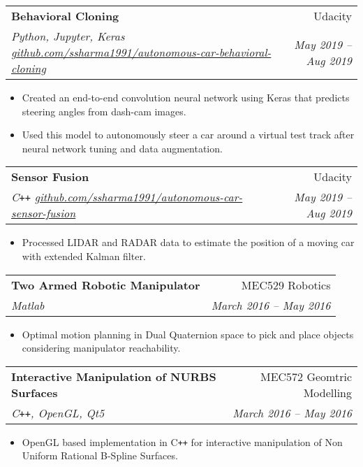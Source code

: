 \documentclass[letterpaper,10pt]{article}
\makeatletter
\newcommand{\resumeHeading}[4]{
  \vspace{-1pt}
    \begin{tabular*}{0.97\textwidth}{l@{\extracolsep{\fill}}r}
      \textbf{#1} & #2 \vspace{-2pt}\\ \vspace{1pt}
      \textit{\small#3} & \textit{\small #4} \\
    \end{tabular*}
}
\newcommand{\resumeItemListStart}{
\vspace{-7pt}
\begin{itemize}[leftmargin=14pt]
}
\newcommand{\resumeItemListEnd}{
\vspace{+7pt}
\end{itemize}
}
\newcommand{\resumeItem}[1]{
  \item\small{
      {#1 \vspace{-7pt}
      }
  }
}
\makeatother
\begin{document}
    \vspace{-2pt}
    \resumeHeading{Behavioral Cloning}{Udacity}{Python, Jupyter, Keras \href{https://github.com/ssharma1991/autonomous-car-behavioral-cloning}{github.com/ssharma1991/autonomous-car-behavioral-cloning}}{May 2019 -- Aug 2019}
    \resumeItemListStart
    \resumeItem{Created an end-to-end convolution neural network using Keras that predicts steering angles from dash-cam images.}
    \resumeItem{Used this model to autonomously steer a car  around a virtual test track after neural network tuning and data augmentation.}
    \resumeItemListEnd
    
    \vspace{-2pt}
    \resumeHeading{Sensor Fusion}{Udacity}{C\texttt{++} \href{https://github.com/ssharma1991/autonomous-car-sensor-fusion}{github.com/ssharma1991/autonomous-car-sensor-fusion}}{May 2019 -- Aug 2019}
    \resumeItemListStart
    \resumeItem{Processed LIDAR and RADAR data to estimate the position of a moving car with extended Kalman filter.}
    \resumeItemListEnd
    
    
    \vspace{-2pt}
    \resumeHeading{Two Armed Robotic Manipulator}{MEC529 Robotics}{Matlab}{March 2016 -- May 2016}
    \resumeItemListStart
    \resumeItem{Optimal motion planning in Dual Quaternion space to pick and place objects considering manipulator reachability.}
    \resumeItemListEnd
    
    \vspace{-2pt}
    \resumeHeading{Interactive Manipulation of NURBS Surfaces}{MEC572 Geomtric Modelling}{C\texttt{++}, OpenGL, Qt5}{March 2016 -- May 2016}
    \resumeItemListStart
    \resumeItem{OpenGL based implementation in C\texttt{++} for interactive manipulation of Non Uniform Rational B-Spline Surfaces.}
    \resumeItemListEnd
    
\end{document}
